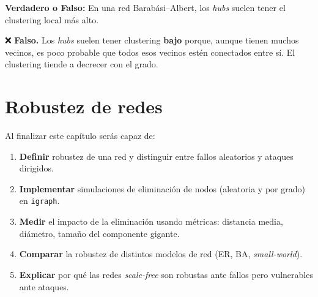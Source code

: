\documentclass[
  letterpaper,
  DIV=11,
  numbers=noendperiod]{scrreprt}
\providecommand{\tightlist}{%
  \setlength{\itemsep}{0pt}\setlength{\parskip}{0pt}}
\begin{document}
\begin{tcolorbox}[enhanced jigsaw, toprule=.15mm, colframe=quarto-callout-caution-color-frame, coltitle=black, titlerule=0mm, colback=white, breakable, leftrule=.75mm, arc=.35mm, bottomtitle=1mm, toptitle=1mm, rightrule=.15mm, bottomrule=.15mm, left=2mm, title=\textcolor{quarto-callout-caution-color}{\faFire}\hspace{0.5em}{Pregunta 5}, colbacktitle=quarto-callout-caution-color!10!white, opacityback=0, opacitybacktitle=0.6]

\textbf{Verdadero o Falso:} En una red Barabási--Albert, los \emph{hubs}
suelen tener el clustering local más alto.

❌ \textbf{Falso.} Los \emph{hubs} suelen tener clustering \textbf{bajo}
porque, aunque tienen muchos vecinos, es poco probable que todos esos
vecinos estén conectados entre sí. El clustering tiende a decrecer con
el grado.

\end{tcolorbox}


\chapter{Robustez de redes}\label{sec-robustez}

\begin{tcolorbox}[enhanced jigsaw, toprule=.15mm, colframe=quarto-callout-note-color-frame, coltitle=black, titlerule=0mm, colback=white, breakable, leftrule=.75mm, arc=.35mm, bottomtitle=1mm, toptitle=1mm, rightrule=.15mm, bottomrule=.15mm, left=2mm, title=\textcolor{quarto-callout-note-color}{\faInfo}\hspace{0.5em}{🎯 Objetivos de aprendizaje}, colbacktitle=quarto-callout-note-color!10!white, opacityback=0, opacitybacktitle=0.6]

Al finalizar este capítulo serás capaz de:

\begin{enumerate}
\def\labelenumi{\arabic{enumi}.}
\tightlist
\item
  \textbf{Definir} robustez de una red y distinguir entre fallos
  aleatorios y ataques dirigidos.
\item
  \textbf{Implementar} simulaciones de eliminación de nodos (aleatoria y
  por grado) en \texttt{igraph}.
\item
  \textbf{Medir} el impacto de la eliminación usando métricas: distancia
  media, diámetro, tamaño del componente gigante.
\item
  \textbf{Comparar} la robustez de distintos modelos de red (ER, BA,
  \emph{small-world}).
\item
  \textbf{Explicar} por qué las redes \emph{scale-free} son robustas
  ante fallos pero vulnerables ante ataques.
\end{enumerate}

\end{tcolorbox}
\end{document}
